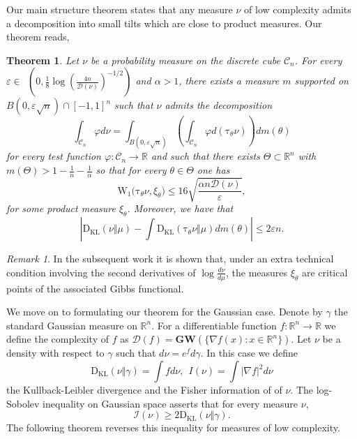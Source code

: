 \documentclass[12pt]{article}
\def \I{\mathcal{I}}
\def \tilt{ \mathrm{\tau} }
\def \W{\mathrm{W_1}}
\def \RR {\mathbb R}
\def \eps {\varepsilon}
\def \DC {\mathcal{C}_n}
\def \MW {\mathbf{GW}}
\def \KL {\mathrm{D}_{\mathrm{KL}}}
\def \Comp { \mathcal{D} }
\newtheorem{theorem}{Theorem}
\theoremstyle{definition}
\theoremstyle{remark}
\newtheorem{remark}{Remark}
\begin{document}
Our main structure theorem states that any measure $\nu$ of low complexity admits a decomposition into small tilts which are close to product measures. Our theorem reads,
\begin{theorem} \label{thm:maindecomp}
	Let $\nu$ be a probability measure on the discrete cube $\DC$. For every {\small $\eps \in \\$ $\left (0, \tfrac 1 8 \log \left ( \tfrac{4n}{\Comp(\nu)} \right )^{-1/2} \right  )$} and $\alpha > 1$, there exists a measure $m$ supported on $B(0, \eps \sqrt{n}) \cap [- 1 ,1 ]^n $ such that $\nu$ admits the decomposition
	\begin{equation}\label{eq:decomp1}
	\int_{\DC} \varphi d \nu = \int_{B(0, \eps \sqrt{n})} \left (\int_{\DC} \varphi d (\tilt_\theta \nu) \right )  d m(\theta)
	\end{equation}
	for every test function $\varphi: \DC \to \RR$ and such that there exists $\Theta \subset \RR^n$ with $m(\Theta) > 1-\frac{1}{n}-\frac{1}{\alpha}$ so that for every $\theta \in \Theta$ one has
	\begin{equation}\label{eq:thmmd-2}
	\W \bigl (\tilt_\theta \nu, \xi_\theta \bigr ) \leq 16 \sqrt{\frac{\alpha n \Comp(\nu) }{\eps}},
	\end{equation}
	for some product measure $\xi_\theta$. Moreover, we have that
	\begin{equation}\label{eq:thmmd-3}
	\left | \KL(\nu \Vert \mu) - \int \KL( \tilt_\theta \nu \Vert \mu ) d m(\theta) \right | \leq 2 \eps n.
	\end{equation}
\end{theorem}
\begin{remark}
	In the subsequent work \cite{EldanGross-Decomp} it is shown that, under an extra technical condition involving the second derivatives of $\log \frac{d \nu}{d \mu}$, the measures $\xi_\theta$ are critical points of the associated Gibbs functional. 
\end{remark}
We move on to formulating our theorem for the Gaussian case. Denote by $\gamma$ the standard Gaussian measure on $\RR^n$. For a differentiable function $f:\RR^n \to \RR$ we define the complexity of $f$ as $\Comp(f) = \MW(\{\nabla f(x): x \in \RR^n \})$. Let $\nu$ be a density with respect to $\gamma$ such that $d \nu = e^f d \gamma$. In this case we define
$$
\KL(\nu \Vert \gamma) = \int f d \nu, ~~ I(\nu) = \int |\nabla f|^2 d \nu
$$
the Kullback-Leibler divergence and the Fisher information of of $\nu$. The log-Sobolev inequality on Gaussian space asserts that for every measure $\nu$,
$$
\I(\nu) \geq 2 \KL(\nu \Vert \gamma). 
$$
The following theorem reverses this inequality for measures of low complexity.
\end{document}
